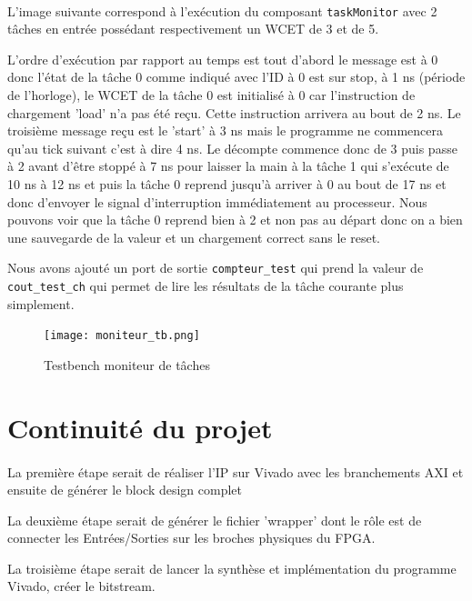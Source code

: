 \documentclass[a4paper,12pt]{report}
\begin{document}
			\paragraph*{}
			L'image suivante correspond à l'exécution du composant \texttt{taskMonitor} avec 2 tâches en entrée possédant respectivement un WCET de 3 et de 5.
			
			L'ordre d'exécution par rapport au temps est tout d'abord le message est à 0 donc l'état de la tâche 0 comme indiqué avec l'ID à 0 est sur stop, à 1 ns (période de l'horloge), le WCET de la tâche 0 est initialisé à 0 car l'instruction de chargement 'load' n'a pas été reçu. Cette instruction arrivera au bout de 2 ns. Le troisième message reçu est le 'start' à 3 ns mais le programme ne commencera qu'au tick suivant c'est à dire 4 ns. Le décompte commence donc de 3 puis passe à 2 avant d'être stoppé à 7 ns pour laisser la main à la tâche 1 qui s'exécute de 10 ns à 12 ns et puis la tâche 0 reprend jusqu'à arriver à 0 au bout de 17 ns et donc d'envoyer le signal d'interruption immédiatement au processeur. Nous pouvons voir que la tâche 0 reprend bien à 2 et non pas au départ donc on a bien une sauvegarde de la valeur et un chargement correct sans le reset.
			
			Nous avons ajouté un port de sortie \texttt{compteur\_test} qui prend la valeur de \texttt{cout\_test\_ch} qui permet de lire les résultats de la tâche courante plus simplement.

			\begin{figure}[H]
				\centering
					\texttt{[image: moniteur\_tb.png]}
					\caption{Testbench moniteur de tâches}
				\label{monitorTB}
			\end{figure}
	
	\section{Continuité du projet}
		\paragraph*{}
		La première étape serait de réaliser l'IP sur Vivado avec les branchements AXI et ensuite de générer le block design complet 
		
		La deuxième étape serait de générer le fichier 'wrapper' dont le rôle est de connecter les Entrées/Sorties sur les broches physiques du FPGA.
		
		La troisième étape serait de lancer la synthèse et implémentation du programme Vivado, créer le bitstream.
		
\end{document}
